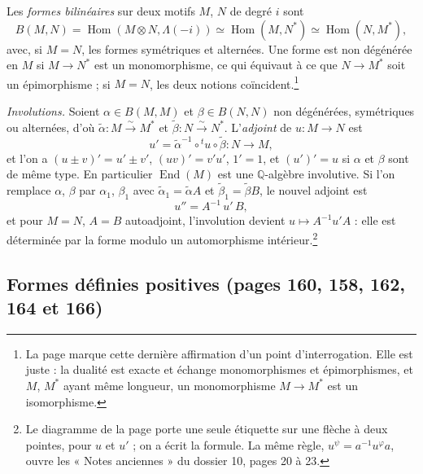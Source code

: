 \documentclass[11pt,a4paper]{article}
\begin{document}
Les \emph{formes bilinéaires} sur deux motifs $M$, $N$ de degré $i$ sont
\[
B(M, N) = \operatorname{Hom}(M \otimes N, \Lambda(-i)) \simeq \operatorname{Hom}(M, N^{*})
\simeq \operatorname{Hom}(N, M^{*}) ,
\]
avec, si $M = N$, les formes symétriques et alternées. Une forme est non dégénérée en
$M$ si $M \to N^{*}$ est un monomorphisme, ce qui équivaut à ce que $N \to M^{*}$ soit
un épimorphisme ; si $M = N$, les deux notions coïncident.\footnote{La page marque
cette dernière affirmation d'un point d'interrogation. Elle est juste : la dualité
est exacte et échange monomorphismes et épimorphismes, et $M$, $M^{*}$ ayant même
longueur, un monomorphisme $M \to M^{*}$ est un isomorphisme.}

\emph{Involutions.} Soient $\alpha \in B(M, M)$ et $\beta \in B(N, N)$ non dégénérées,
symétriques ou alternées, d'où $\tilde{\alpha} \colon M \xrightarrow{\sim} M^{*}$ et
$\tilde{\beta} \colon N \xrightarrow{\sim} N^{*}$. L'\emph{adjoint} de $u \colon M \to N$
est
\[
u' = \tilde{\alpha}^{-1} \circ {}^{t}u \circ \tilde{\beta} \colon N \longrightarrow M ,
\]
et l'on a $(u \pm v)' = u' \pm v'$, $(uv)' = v'u'$, $1' = 1$, et $(u')' = u$ si $\alpha$
et $\beta$ sont de même type. En particulier $\operatorname{End}(M)$ est une
$\mathbb{Q}$-algèbre involutive. Si l'on remplace $\alpha$, $\beta$ par $\alpha_{1}$,
$\beta_{1}$ avec $\tilde{\alpha}_{1} = \tilde{\alpha} A$ et $\tilde{\beta}_{1} =
\tilde{\beta} B$, le nouvel adjoint est
\[
u'' = A^{-1}\,u'\,B ,
\]
et pour $M = N$, $A = B$ autoadjoint, l'involution devient $u \mapsto A^{-1}u'A$ :
elle est déterminée par la forme modulo un automorphisme intérieur.\footnote{Le
diagramme de la page porte une seule étiquette sur une flèche à deux pointes, pour
$u$ et $u'$ ; on a écrit la formule. La même règle, $u^{\psi} = a^{-1}u^{\varphi}a$,
ouvre les « Notes anciennes » du dossier 10, pages 20 à 23.}

\subsection*{Formes définies positives (pages 160, 158, 162, 164 et 166)}
\end{document}
